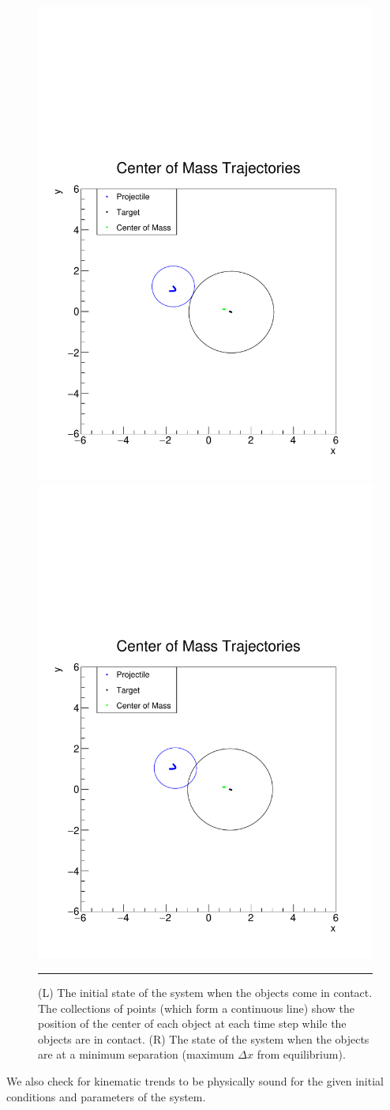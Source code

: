 \documentclass[aps,prl,floatfix,preprint,nofootinbib]{revtex4}
\begin{document}
\begin{figure}[h!]
  \includegraphics[width=.45\textwidth]{../diff_system_plots/default/x_vs_y_with_ellipse.pdf}
  \includegraphics[width=.45\textwidth]{../diff_system_plots/default/x_vs_y_with_ellipse_MS.pdf}
                  {\par\nobreak\rule[9pt]{35em}{0.5pt}\vspace{-5mm}}
                  \caption{(L) The initial state of the system when the objects come in contact. The collections of points (which form a continuous line) show the position of the center of each object at each time step while the objects are in contact. (R) The state of the system when the objects are at a minimum separation (maximum $\Delta x$ from equilibrium).}
                  \label{fig:tracks_default}
\end{figure}
We also check for kinematic trends to be physically sound for the given initial conditions and parameters of the system.
\end{document}
